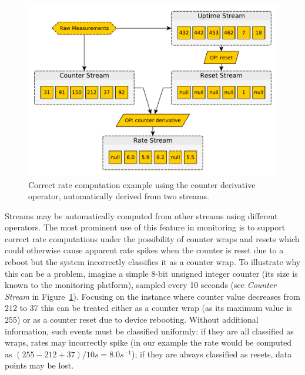 \documentclass[5p,sort&compress]{elsarticle}
\begin{document}
\begin{figure}
  \centering
  \includegraphics[scale=0.4]{figures/datastream-counter-reset.pdf}
  \caption{Correct rate computation example using the counter derivative operator, automatically derived from two streams.}
  \label{fig:datastream-counter-reset}
\end{figure}

Streams may be automatically computed from other streams using different operators.
The most prominent use of this feature in monitoring is to support correct rate computations under the possibility of counter wraps and resets which could otherwise cause apparent rate spikes when the counter is reset due to a reboot but the system incorrectly classifies it as a counter wrap.
To illustrate why this can be a problem, imagine a simple 8-bit unsigned integer counter (its size is known to the monitoring platform), sampled every 10 seconds (see \textit{Counter Stream} in Figure~\ref{fig:datastream-counter-reset}).
Focusing on the instance where counter value decreases from $212$ to $37$ this can be treated either as a counter wrap (as its maximum value is $255$) or as a counter reset due to device rebooting.
Without additional information, such events must be classified uniformly: if they are all classified as wraps, rates may incorrectly spike (in our example the rate would be computed as $(255 - 212 + 37) / 10s = 8.0s^{-1}$); if they are always classified as resets, data points may be lost.
\end{document}
